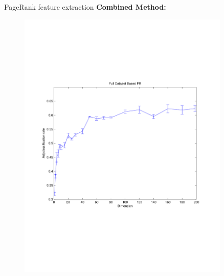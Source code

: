 \documentclass[xcolor=dvipsnames,t]{beamer} %
\begin{document}
\begin{frame}{PageRank feature extraction}
\textbf{Combined Method:}
\vspace{-1in}
\begin{figure}
\centering
\includegraphics[width=0.9\textwidth]{figures/fullPR.pdf}
\end{figure}

\end{frame}
\end{document}

